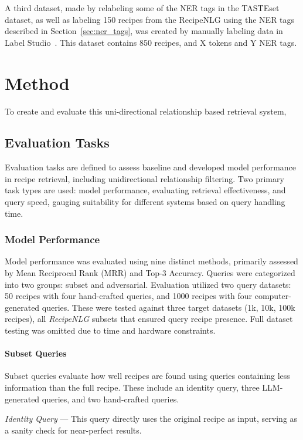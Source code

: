 \documentclass[11pt]{article}
\begin{document}
A third dataset, made by relabeling some of the NER tags in the TASTEset dataset,
as well as labeling 150 recipes from the RecipeNLG using the NER tags
described in Section~\ref{sec:ner_tags}, was created by manually labeling
data in Label Studio~\cite{LabelStudio}.
This dataset contains 850 recipes, and X tokens and Y NER tags.

\section{Method}
To create and evaluate this uni-directional relationship based retrieval system, 

\subsection{Evaluation Tasks}
Evaluation tasks are defined to assess baseline and developed model performance
in recipe retrieval, including unidirectional relationship filtering.
Two primary task types are used: model performance, evaluating retrieval
effectiveness, and query speed, gauging suitability for different systems based
on query handling time.

\subsubsection{Model Performance}\label{sec:modelperfomance}
Model performance was evaluated using nine distinct methods, primarily assessed
by Mean Reciprocal Rank (MRR) and Top-3 Accuracy.
Queries were categorized into two groups: subset and adversarial.
Evaluation utilized two query datasets: 50 recipes with four hand-crafted
queries, and 1000 recipes with four computer-generated queries.
These were tested against three target datasets (1k, 10k, 100k recipes), all
\emph{RecipeNLG} subsets that ensured query recipe presence.
Full dataset testing was omitted due to time and hardware constraints.
\paragraph{Subset Queries}
Subset queries evaluate how well recipes are found using queries containing less
information than the full recipe.
These include an identity query, three LLM-generated queries, and two
hand-crafted queries.

\emph{Identity Query} --- This query directly uses the original recipe as input,
serving as a sanity check for near-perfect results.
\end{document}
